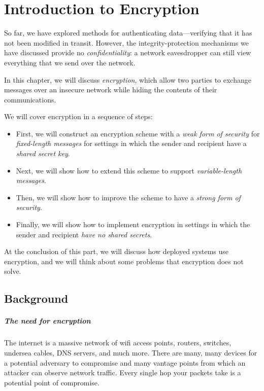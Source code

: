 \chapter{Introduction to Encryption}

So far, we have explored methods for authenticating data---verifying that it has not been modified in transit.
However, the integrity-protection mechanisms we
have discussed provide no \emph{confidentiality}:
a network eavesdropper can still view everything that 
we send over the network.

In this chapter, we will discuss \emph{encryption},
which allow two parties to exchange messages over an insecure
network while hiding the contents of their communications.


We will cover encryption in a sequence of steps:
\begin{itemize}
  \item First, we will construct an encryption scheme with a \emph{weak form of security} for \emph{fixed-length messages} for settings in which the sender and recipient have a \emph{shared secret key}.
  \item Next, we will show how to extend this scheme to support \emph{variable-length messages}.
  \item Then, we will show how to improve the scheme to have a \emph{strong form of security}.
  \item Finally, we will show how to implement encryption in settings in which the sender and recipient \emph{have no shared secrets}.
\end{itemize}
At the conclusion of this part, we will discuss how deployed systems
use encryption, and 
we will think about some problems that encryption does not solve.

\section{Background}

\paragraph{The need for encryption}
The internet is a massive network of wifi access
points, routers, switches, undersea cables, DNS
servers, and much more.
There are many, many
devices for a potential adversary to compromise
and many vantage points from which an attacker can 
observe network traffic. Every single hop your
packets take is a potential point of compromise.


